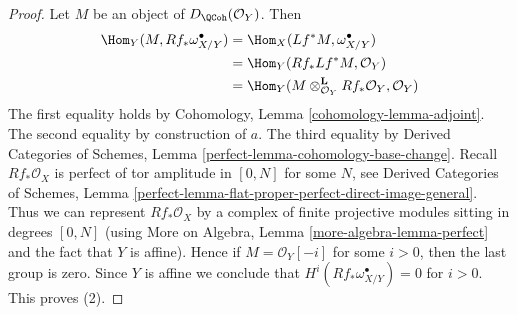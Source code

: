 \begin{proof}
\medskip\noindent
Let $M$ be an object of $D_\QCoh(\mathcal{O}_Y)$. Then
\begin{align*}
\Hom_Y(M, Rf_*\omega_{X/Y}^\bullet) & =
\Hom_X(Lf^*M, \omega_{X/Y}^\bullet) \\
& =
\Hom_Y(Rf_*Lf^*M, \mathcal{O}_Y) \\
& =
\Hom_Y(M \otimes_{\mathcal{O}_Y}^\mathbf{L} Rf_*\mathcal{O}_Y, \mathcal{O}_Y)
\end{align*}
The first equality holds by Cohomology, Lemma
\ref{cohomology-lemma-adjoint}.
The second equality by construction of $a$.
The third equality by Derived Categories of Schemes, Lemma
\ref{perfect-lemma-cohomology-base-change}.
Recall $Rf_*\mathcal{O}_X$ is perfect of tor amplitude in $[0, N]$
for some $N$, see
Derived Categories of Schemes, Lemma
\ref{perfect-lemma-flat-proper-perfect-direct-image-general}.
Thus we can represent $Rf_*\mathcal{O}_X$ by a complex of
finite projective modules sitting in degrees $[0, N]$
(using More on Algebra, Lemma \ref{more-algebra-lemma-perfect}
and the fact that $Y$ is affine).
Hence if $M = \mathcal{O}_Y[-i]$ for some $i > 0$, then the last
group is zero. Since $Y$ is affine we conclude that
$H^i(Rf_*\omega_{X/Y}^\bullet) = 0$ for $i > 0$.
This proves (2).


\end{proof}
